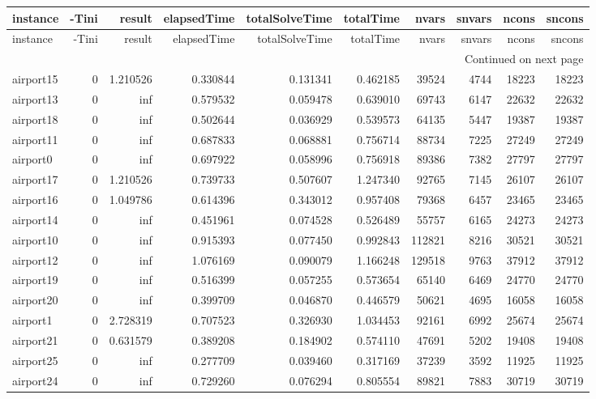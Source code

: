 \documentclass[../../../thesis.tex]{subfiles}
\begin{document}
\tiny
\begin{longtable}{|l|r|r|r|r|r|r|r|r|r|}
\toprule
instance & -Tini & result & elapsedTime & totalSolveTime & totalTime & nvars & snvars & ncons & sncons \\
\midrule
\endfirsthead
\toprule
instance & -Tini & result & elapsedTime & totalSolveTime & totalTime & nvars & snvars & ncons & sncons \\
\midrule
\endhead
\midrule
\multicolumn{10}{r}{Continued on next page} \\
\midrule
\endfoot
\bottomrule
\endlastfoot
airport15 & 0 & 1.210526 & 0.330844 & 0.131341 & 0.462185 & 39524 & 4744 & 18223 & 18223 \\
airport13 & 0 & inf & 0.579532 & 0.059478 & 0.639010 & 69743 & 6147 & 22632 & 22632 \\
airport18 & 0 & inf & 0.502644 & 0.036929 & 0.539573 & 64135 & 5447 & 19387 & 19387 \\
airport11 & 0 & inf & 0.687833 & 0.068881 & 0.756714 & 88734 & 7225 & 27249 & 27249 \\
airport0 & 0 & inf & 0.697922 & 0.058996 & 0.756918 & 89386 & 7382 & 27797 & 27797 \\
airport17 & 0 & 1.210526 & 0.739733 & 0.507607 & 1.247340 & 92765 & 7145 & 26107 & 26107 \\
airport16 & 0 & 1.049786 & 0.614396 & 0.343012 & 0.957408 & 79368 & 6457 & 23465 & 23465 \\
airport14 & 0 & inf & 0.451961 & 0.074528 & 0.526489 & 55757 & 6165 & 24273 & 24273 \\
airport10 & 0 & inf & 0.915393 & 0.077450 & 0.992843 & 112821 & 8216 & 30521 & 30521 \\
airport12 & 0 & inf & 1.076169 & 0.090079 & 1.166248 & 129518 & 9763 & 37912 & 37912 \\
airport19 & 0 & inf & 0.516399 & 0.057255 & 0.573654 & 65140 & 6469 & 24770 & 24770 \\
airport20 & 0 & inf & 0.399709 & 0.046870 & 0.446579 & 50621 & 4695 & 16058 & 16058 \\
airport1 & 0 & 2.728319 & 0.707523 & 0.326930 & 1.034453 & 92161 & 6992 & 25674 & 25674 \\
airport21 & 0 & 0.631579 & 0.389208 & 0.184902 & 0.574110 & 47691 & 5202 & 19408 & 19408 \\
airport25 & 0 & inf & 0.277709 & 0.039460 & 0.317169 & 37239 & 3592 & 11925 & 11925 \\
airport24 & 0 & inf & 0.729260 & 0.076294 & 0.805554 & 89821 & 7883 & 30719 & 30719 \\

\end{longtable}
\end{document}
